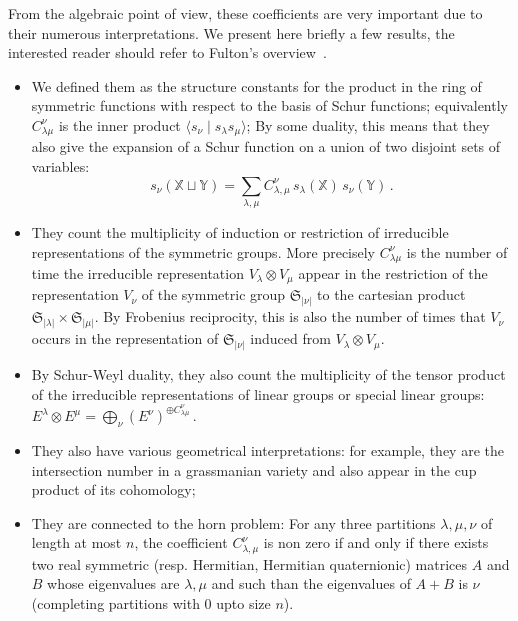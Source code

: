 \documentclass[12pt]{article}
\newcommand{\SG}{{\mathfrak S}}
\newcommand{\alphX}{{\mathbb X}}
\newcommand{\alphY}{{\mathbb Y}}
\begin{document}
From the algebraic point of view, these coefficients are very important due to
their numerous interpretations. We present here briefly a few results, the
interested reader should refer to Fulton's overview~\cite{Fulton97}.
\begin{itemize}
\item We defined them as the structure constants for the product in the ring
  of symmetric functions with respect to the basis of Schur functions;
  equivalently $C_{\lambda\mu}^\nu$ is the inner product $\langle s_\nu \mid
  s_\lambda s_\mu\rangle$; By some duality, this means that they also give the
  expansion of a Schur function on a union of two disjoint sets of variables:
  \begin{equation}
    s_\nu(\alphX\sqcup\alphY) = 
    \sum_{\lambda,\mu} C_{\lambda,\mu}^{\nu}\,
    s_\lambda(\alphX)\, s_\nu(\alphY)\,.
  \end{equation}
\item They count the multiplicity of induction or restriction of irreducible
  representations of the symmetric groups. More precisely $C_{\lambda\mu}^\nu$
  is the number of time the irreducible representation $V_\lambda \otimes
  V_\mu$ appear in the restriction of the representation $V_\nu$ of the
  symmetric group $\SG_{|\nu|}$ to the cartesian product $\SG_{|\lambda|}
  \times \SG_{|\mu|}$. By Frobenius reciprocity, this is also the number of
  times that $V_\nu$ occurs in the representation of $\SG_{|\nu|}$ induced
  from $V_\lambda \otimes V_\mu$.
\item By Schur-Weyl duality, they also count the multiplicity of the tensor
  product of the irreducible representations of linear groups or special
  linear groups:
    $E^\lambda \otimes E^\mu =\bigoplus_\nu (E^\nu)^{\oplus C_{\lambda\mu}^\nu}\,.$
  \item They also have various geometrical interpretations: for example, they
    are the intersection number in a grassmanian variety and also appear in
    the cup product of its cohomology;
  \item They are connected to the horn problem: For any three partitions
    $\lambda,\mu,\nu$ of length at most $n$, the coefficient
    $C_{\lambda,\mu}^{\nu}$ is non zero if and only if there exists two real
    symmetric (resp. Hermitian, Hermitian quaternionic) matrices $A$ and $B$
    whose eigenvalues are $\lambda,\mu$ and such than the eigenvalues of $A+B$
    is $\nu$ (completing partitions with $0$ upto size $n$).

\end{itemize}
\end{document}
